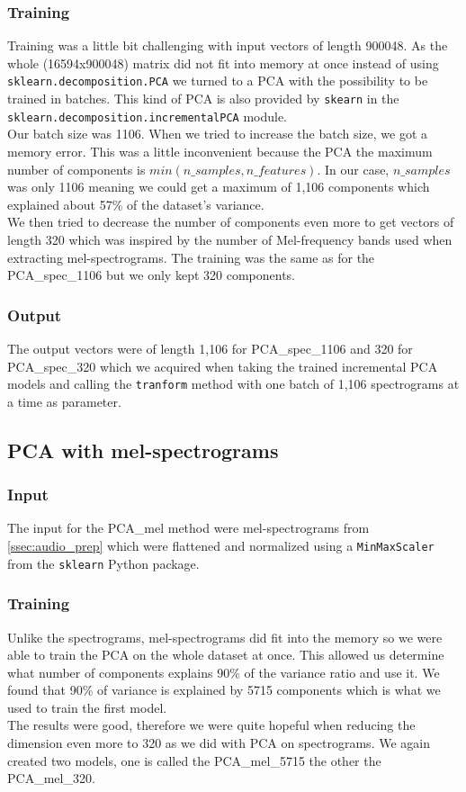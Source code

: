 \subsubsection{Training}
Training was a little bit challenging with input vectors of length 900048. As the whole (16594x900048) matrix did not fit into memory at once instead of using \texttt{sklearn.decomposition.PCA} we turned to a PCA with the possibility to be trained in batches. This kind of PCA is also provided by \texttt{skearn} in the \texttt{sklearn.decomposition.incrementalPCA} module. \\ 
Our batch size was 1106. When we tried to increase the batch size, we got a memory error. This was a little inconvenient because the PCA the maximum number of components is $min(n\_samples, n\_features)$. In our case, $n\_samples$ was only 1106 meaning we could get a maximum of 1,106 components which explained about 57\% of the dataset's variance. \\
We then tried to decrease the number of components even more to get vectors of length 320 which was inspired by the number of Mel-frequency bands used when extracting mel-spectrograms. The training was the same as for the PCA\_spec\_1106 but we only kept 320 components.

\subsubsection{Output}
The output vectors were of length 1,106 for PCA\_spec\_1106 and 320 for PCA\_spec\_320 which we acquired when taking the trained incremental PCA models and calling the \texttt{tranform} method with one batch of 1,106 spectrograms at a time as parameter.

\subsection{PCA with mel-spectrograms}\label{ssec:pca_mel_experiments}
\subsubsection{Input}
The input for the PCA\_mel method were mel-spectrograms from \ref{ssec:audio_prep} which were flattened and normalized using a \texttt{MinMaxScaler} from the \texttt{sklearn} Python package.

\subsubsection{Training}
Unlike the spectrograms, mel-spectrograms did fit into the memory so we were able to train the PCA on the whole dataset at once. This allowed us determine what number of components explains 90\% of the variance ratio and use it. We found that 90\% of variance is explained by 5715 components which is what we used to train the first model. \\
The results were good, therefore we were quite hopeful when reducing the dimension even more to 320 as we did with PCA on spectrograms. We again created two models, one is called the PCA\_mel\_5715 the other the PCA\_mel\_320. 

